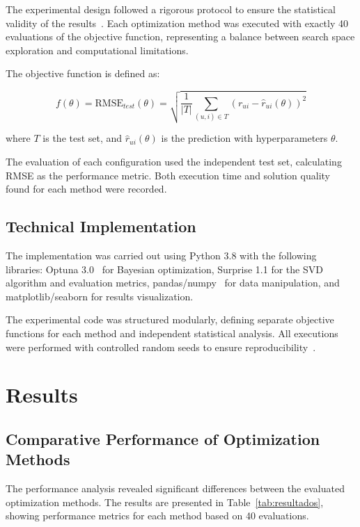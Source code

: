 \documentclass[conference]{IEEEtran}
\begin{document}
The experimental design followed a rigorous protocol to ensure the statistical validity of the results~\cite{hansen2016cma}. Each optimization method was executed with exactly 40 evaluations of the objective function, representing a balance between search space exploration and computational limitations.

The objective function is defined as:

\begin{equation}
f(\theta) = \text{RMSE}_{test}(\theta) = \sqrt{\frac{1}{|T|} \sum_{(u,i) \in T} (r_{ui} - \hat{r}_{ui}(\theta))^2}
\end{equation}

where $T$ is the test set, and $\hat{r}_{ui}(\theta)$ is the prediction with hyperparameters $\theta$.

The evaluation of each configuration used the independent test set, calculating RMSE as the performance metric. Both execution time and solution quality found for each method were recorded.

\subsection{Technical Implementation}

The implementation was carried out using Python 3.8 with the following libraries: Optuna 3.0~\cite{akiba2019optuna} for Bayesian optimization, Surprise 1.1 for the SVD algorithm and evaluation metrics, pandas/numpy~\cite{harris2020array} for data manipulation, and matplotlib/seaborn for results visualization.

The experimental code was structured modularly, defining separate objective functions for each method and independent statistical analysis. All executions were performed with controlled random seeds to ensure reproducibility~\cite{plappert2018parameter}.

\section{Results}

\subsection{Comparative Performance of Optimization Methods}

The performance analysis revealed significant differences between the evaluated optimization methods. The results are presented in Table~\ref{tab:resultados}, showing performance metrics for each method based on 40 evaluations.
\end{document}

